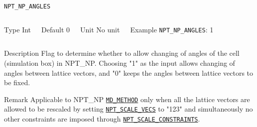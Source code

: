 \begin{frame}[allowframebreaks]{\texttt{NPT\_NP\_ANGLES}} \label{NPT_NP_ANGLES}
\vspace*{-12pt}
\begin{columns}
\begin{block}{Type}
Int
\end{block}

\begin{block}{Default}
0
\end{block}

\begin{block}{Unit}
No unit
\end{block}

\begin{block}{Example}
\texttt{NPT\_NP\_ANGLES}: 1
\end{block}
\end{columns}

\begin{block}{Description}
Flag to determine whether to allow changing of angles of the cell (simulation box) in NPT\_NP. Choosing "1" as the input allows changing of angles between lattice vectors, and "0" keeps the angles between lattice vectors to be fixed.
\end{block}

\begin{block}{Remark}
Applicable to NPT\_NP \hyperlink{MD_METHOD}{\texttt{MD\_METHOD}} only when all the lattice vectors are allowed to be rescaled by setting \hyperlink{NPT_SCALE_VECS}{\texttt{NPT\_SCALE\_VECS}} to "123" and simultaneously no other constraints are imposed through \hyperlink{NPT_SCALE_CONSTRAINTS}{\texttt{NPT\_SCALE\_CONSTRAINTS}}.
\end{block}

\end{frame}



